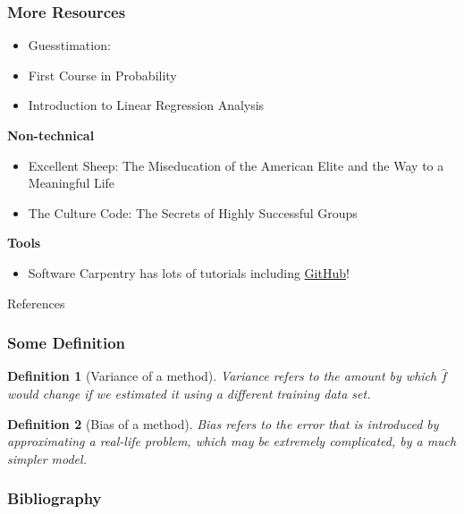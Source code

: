 \documentclass[serif, xcolor={dvipsnames}]{beamer} %
\newtheorem{deff}{Definition}
\begin{document}
\begin{frame}[t]
\frametitle{More Resources}

\begin{itemize}
\item {\scriptsize Guesstimation:~\citep{weinstein2008guesstimation}}
\item {\scriptsize First Course in Probability~\citep{ross1976first}}
\item {\scriptsize Introduction to Linear Regression Analysis~\citep{montgomery2021introduction}}
\end{itemize}
{\bf \scriptsize  Non-technical}
\begin{itemize}
\item {\scriptsize Excellent Sheep: The Miseducation of the American Elite and the Way to a Meaningful Life~\citep{sheep}}
\item {\scriptsize The Culture Code: The Secrets of Highly Successful Groups~\citep{CultureCode}}
\end{itemize}

{\bf \scriptsize  Tools}
\begin{itemize}
\item {\scriptsize Software Carpentry has lots of tutorials including \href{https://swcarpentry.github.io/git-novice/}{GitHub}!}
\end{itemize}
\end{frame}


\begin{frame}[allowframebreaks,t]{References} 
\frametitle{Some Definition}


\begin{deff}[Variance of a method] Variance refers to the amount by which
$\hat f$ would change if we estimated it using a different training data set.
\end{deff}
\pause
\begin{deff}[Bias of a method] Bias refers to the error that is introduced by approximating a real-life problem, which may be extremely complicated, by a much simpler model.
\end{deff}

\end{frame}


\begin{frame}
\frametitle{Bibliography}
\nocite{*}
\printbibliography

\end{frame}
\end{document}
